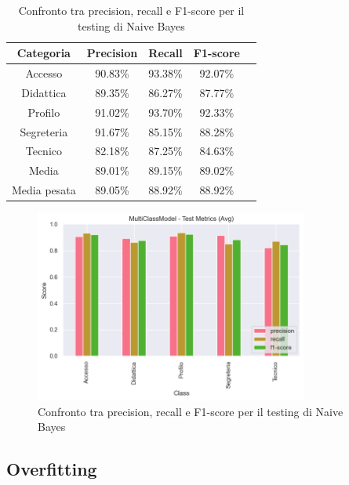 \begin{table}[H]
    \centering
    \begin{tabular}{|c|c|c|c|c|}
        \hline
        \textbf{Categoria} & \textbf{Precision} & \textbf{Recall} & \textbf{F1-score} \\
        \hline
        Accesso & 90.83\% & 93.38\% & 92.07\% \\
        \hline
        Didattica & 89.35\% & 86.27\% & 87.77\% \\
        \hline
        Profilo & 91.02\% & 93.70\% & 92.33\% \\
        \hline
        Segreteria & 91.67\% & 85.15\% & 88.28\% \\
        \hline
        Tecnico & 82.18\% & 87.25\% & 84.63\% \\
        \hline
        Media & 89.01\% & 89.15\% & 89.02\% \\
        \hline
        Media pesata & 89.05\% & 88.92\% & 88.92\% \\
        \hline
    \end{tabular}
    \caption{Confronto tra precision, recall e F1-score per il testing di Naive Bayes}
    \label{tab:metriche_naive_bayes_test}
\end{table}

\begin{figure}[H]
    \centering
    \includegraphics[width=0.8\textwidth]{images/metrics_test_naive_bayes.png}
    \caption{Confronto tra precision, recall e F1-score per il testing di Naive Bayes}
    \label{fig:metrics_test_naive_bayes}
\end{figure}

\subsection{Overfitting}

